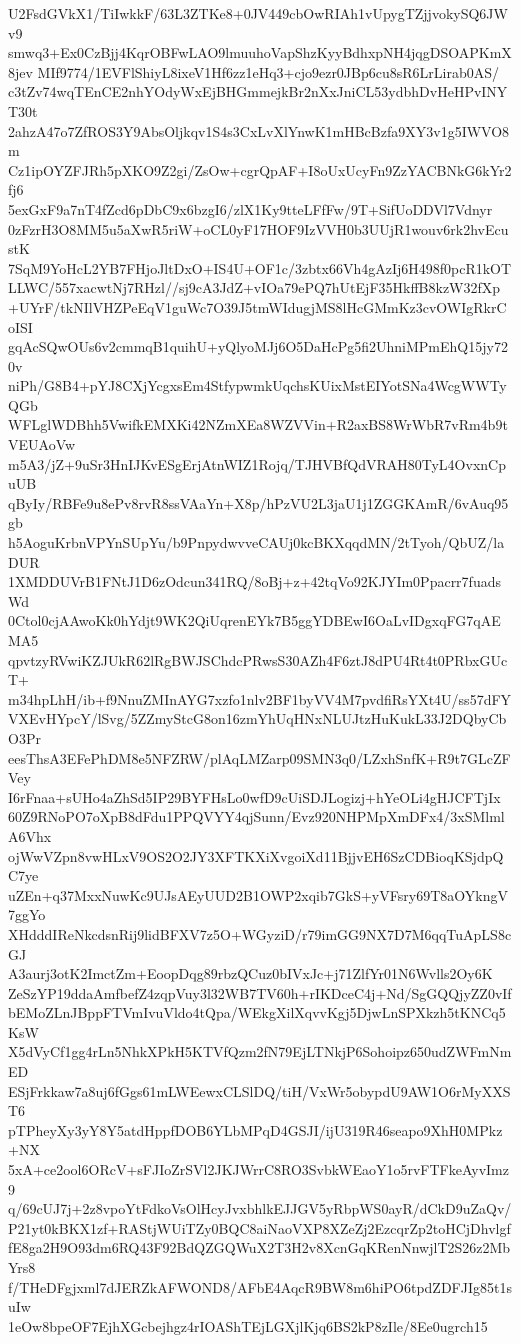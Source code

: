 U2FsdGVkX1/TiIwkkF/63L3ZTKe8+0JV449cbOwRIAh1vUpygTZjjvokySQ6JWv9
smwq3+Ex0CzBjj4KqrOBFwLAO9lmuuhoVapShzKyyBdhxpNH4jqgDSOAPKmX8jev
MIf9774/1EVFlShiyL8ixeV1Hf6zz1eHq3+cjo9ezr0JBp6cu8sR6LrLirab0AS/
c3tZv74wqTEnCE2nhYOdyWxEjBHGmmejkBr2nXxJniCL53ydbhDvHeHPvINYT30t
2ahzA47o7ZfROS3Y9AbsOljkqv1S4s3CxLvXlYnwK1mHBcBzfa9XY3v1g5IWVO8m
Cz1ipOYZFJRh5pXKO9Z2gi/ZsOw+cgrQpAF+I8oUxUcyFn9ZzYACBNkG6kYr2fj6
5exGxF9a7nT4fZcd6pDbC9x6bzgI6/zlX1Ky9tteLFfFw/9T+SifUoDDVl7Vdnyr
0zFzrH3O8MM5u5aXwR5riW+oCL0yF17HOF9IzVVH0b3UUjR1wouv6rk2hvEcustK
7SqM9YoHcL2YB7FHjoJltDxO+IS4U+OF1c/3zbtx66Vh4gAzIj6H498f0pcR1kOT
LLWC/557xacwtNj7RHzl//sj9cA3JdZ+vIOa79ePQ7hUtEjF35HkffB8kzW32fXp
+UYrF/tkNIlVHZPeEqV1guWc7O39J5tmWIdugjMS8lHcGMmKz3cvOWIgRkrCoISI
gqAcSQwOUs6v2cmmqB1quihU+yQlyoMJj6O5DaHcPg5fi2UhniMPmEhQ15jy720v
niPh/G8B4+pYJ8CXjYcgxsEm4StfypwmkUqchsKUixMstEIYotSNa4WcgWWTyQGb
WFLglWDBhh5VwifkEMXKi42NZmXEa8WZVVin+R2axBS8WrWbR7vRm4b9tVEUAoVw
m5A3/jZ+9uSr3HnIJKvESgErjAtnWIZ1Rojq/TJHVBfQdVRAH80TyL4OvxnCpuUB
qByIy/RBFe9u8ePv8rvR8ssVAaYn+X8p/hPzVU2L3jaU1j1ZGGKAmR/6vAuq95gb
h5AoguKrbnVPYnSUpYu/b9PnpydwvveCAUj0kcBKXqqdMN/2tTyoh/QbUZ/laDUR
1XMDDUVrB1FNtJ1D6zOdcun341RQ/8oBj+z+42tqVo92KJYIm0Ppacrr7fuadsWd
0Ctol0cjAAwoKk0hYdjt9WK2QiUqrenEYk7B5ggYDBEwI6OaLvIDgxqFG7qAEMA5
qpvtzyRVwiKZJUkR62lRgBWJSChdcPRwsS30AZh4F6ztJ8dPU4Rt4t0PRbxGUcT+
m34hpLhH/ib+f9NnuZMInAYG7xzfo1nlv2BF1byVV4M7pvdfiRsYXt4U/ss57dFY
VXEvHYpcY/lSvg/5ZZmyStcG8on16zmYhUqHNxNLUJtzHuKukL33J2DQbyCbO3Pr
eesThsA3EFePhDM8e5NFZRW/plAqLMZarp09SMN3q0/LZxhSnfK+R9t7GLcZFVey
I6rFnaa+sUHo4aZhSd5IP29BYFHsLo0wfD9cUiSDJLogizj+hYeOLi4gHJCFTjIx
60Z9RNoPO7oXpB8dFdu1PPQVYY4qjSunn/Evz920NHPMpXmDFx4/3xSMlmlA6Vhx
ojWwVZpn8vwHLxV9OS2O2JY3XFTKXiXvgoiXd11BjjvEH6SzCDBioqKSjdpQC7ye
uZEn+q37MxxNuwKc9UJsAEyUUD2B1OWP2xqib7GkS+yVFsry69T8aOYkngV7ggYo
XHdddIReNkcdsnRij9lidBFXV7z5O+WGyziD/r79imGG9NX7D7M6qqTuApLS8cGJ
A3aurj3otK2ImctZm+EoopDqg89rbzQCuz0bIVxJc+j71ZlfYr01N6Wvlls2Oy6K
ZeSzYP19ddaAmfbefZ4zqpVuy3l32WB7TV60h+rIKDceC4j+Nd/SgGQQjyZZ0vIf
bEMoZLnJBppFTVmIvuVldo4tQpa/WEkgXilXqvvKgj5DjwLnSPXkzh5tKNCq5KsW
X5dVyCf1gg4rLn5NhkXPkH5KTVfQzm2fN79EjLTNkjP6Sohoipz650udZWFmNmED
ESjFrkkaw7a8uj6fGgs61mLWEewxCLSlDQ/tiH/VxWr5obypdU9AW1O6rMyXXST6
pTPheyXy3yY8Y5atdHppfDOB6YLbMPqD4GSJI/ijU319R46seapo9XhH0MPkz+NX
5xA+ce2ool6ORcV+sFJIoZrSVl2JKJWrrC8RO3SvbkWEaoY1o5rvFTFkeAyvImz9
q/69cUJ7j+2z8vpoYtFdkoVsOlHcyJvxbhlkEJJGV5yRbpWS0ayR/dCkD9uZaQv/
P21yt0kBKX1zf+RAStjWUiTZy0BQC8aiNaoVXP8XZeZj2EzcqrZp2toHCjDhvlgf
fE8ga2H9O93dm6RQ43F92BdQZGQWuX2T3H2v8XcnGqKRenNnwjlT2S26z2MbYrs8
f/THeDFgjxml7dJERZkAFWOND8/AFbE4AqcR9BW8m6hiPO6tpdZDFJIg85t1suIw
1eOw8bpeOF7EjhXGcbejhgz4rIOAShTEjLGXjlKjq6BS2kP8zIle/8Ee0ugrch15
